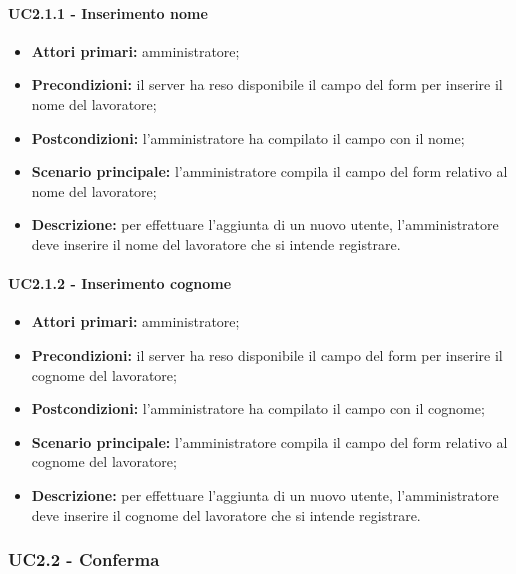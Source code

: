 \paragraph{UC2.1.1 - Inserimento nome}
\begin{itemize}
	\item 	\textbf{Attori primari:} amministratore;
	\item 	\textbf{Precondizioni:} il server ha reso disponibile il campo del form per inserire il nome del lavoratore;
	\item 	\textbf{Postcondizioni:} l'amministratore ha compilato il campo con il nome;
	\item 	\textbf{Scenario principale:} l'amministratore compila il campo del form relativo al nome del lavoratore;
	\item 	\textbf{Descrizione:} per effettuare l'aggiunta di un nuovo utente, l'amministratore deve inserire il nome del lavoratore che si intende registrare.

\end{itemize}

\paragraph{UC2.1.2 - Inserimento cognome}

\begin{itemize}
	\item 	\textbf{Attori primari:} amministratore;
	\item 	\textbf{Precondizioni:} il server ha reso disponibile il campo del form per inserire il cognome del lavoratore;
	\item 	\textbf{Postcondizioni:} l'amministratore ha compilato il campo con il cognome;
	\item 	\textbf{Scenario principale:} l'amministratore compila il campo del form relativo al cognome del lavoratore;
	\item 	\textbf{Descrizione:} per effettuare l'aggiunta di un nuovo utente, l'amministratore deve inserire il cognome del lavoratore che si intende registrare.
	
\end{itemize}

\subsubsection{UC2.2 - Conferma}

